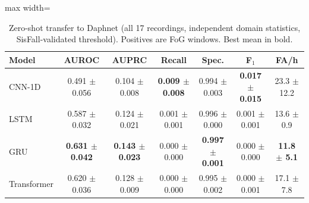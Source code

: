 \begin{table}[ht]
\centering
\footnotesize
\caption{Zero-shot transfer to Daphnet (all 17 recordings, independent domain statistics, SisFall-validated threshold). Positives are FoG windows. Best mean in bold.}
\label{tab:zeroshot}
\setlength{\tabcolsep}{4pt}
\begin{adjustbox}{max width=\textwidth}
\begin{tabular}{lcccccc}
\toprule
Model & AUROC & AUPRC & Recall & Spec. & F$_1$ & FA/h \\
\midrule
CNN-1D & 0.491 $\pm$ 0.056 & 0.104 $\pm$ 0.008 & \textbf{0.009 $\pm$ 0.008} & 0.994 $\pm$ 0.003 & \textbf{0.017 $\pm$ 0.015} & 23.3 $\pm$ 12.2 \\
LSTM & 0.587 $\pm$ 0.032 & 0.124 $\pm$ 0.021 & 0.001 $\pm$ 0.001 & 0.996 $\pm$ 0.000 & 0.001 $\pm$ 0.001 & 13.6 $\pm$ 0.9 \\
GRU & \textbf{0.631 $\pm$ 0.042} & \textbf{0.143 $\pm$ 0.023} & 0.000 $\pm$ 0.000 & \textbf{0.997 $\pm$ 0.001} & 0.000 $\pm$ 0.000 & \textbf{11.8 $\pm$ 5.1} \\
Transformer & 0.620 $\pm$ 0.036 & 0.128 $\pm$ 0.009 & 0.000 $\pm$ 0.000 & 0.995 $\pm$ 0.002 & 0.000 $\pm$ 0.001 & 17.1 $\pm$ 7.8 \\
\bottomrule
\end{tabular}
\end{adjustbox}
\end{table}
